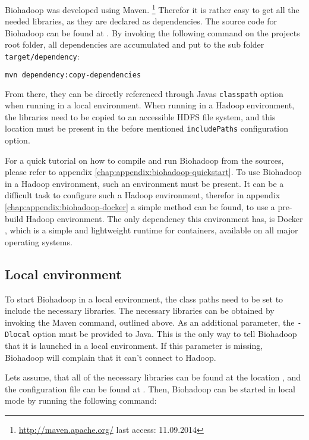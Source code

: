 Biohadoop was developed using Maven. \footnote{\url{http://maven.apache.org/} last access: 11.09.2014} Therefor it is rather easy to get all the needed libraries, as they are declared as dependencies. The source code for Biohadoop can be found at \cite{biohadoop}. By invoking the following command on the projects root folder, all dependencies are accumulated and put to the sub folder \texttt{target/dependency}:

\begin{lstlisting}[language=bash]
mvn dependency:copy-dependencies
\end{lstlisting}

From there, they can be directly referenced through Javas \texttt{classpath} option when running in a local environment. When running in a Hadoop environment, the libraries need to be copied to an accessible HDFS file system, and this location must be present in the before mentioned \texttt{includePaths} configuration option.

For a quick tutorial on how to compile and run Biohadoop from the sources, please refer to appendix \ref{chap:appendix:biohadoop-quickstart}. To use Biohadoop in a Hadoop environment, such an environment must be present. It can be a difficult task to configure such a Hadoop environment, therefor in appendix \ref{chap:appendix:biohadoop-docker} a simple method can be found, to use a pre-build Hadoop environment. The only dependency this environment has, is Docker \cite{docker}, which is a simple and lightweight runtime for containers, available on all major operating systems.

\subsection{Local environment}
\label{chap:usage:local}
To start Biohadoop in a local environment, the class paths need to be set to include the necessary libraries. The necessary libraries can be obtained by invoking the Maven command, outlined above. As an additional parameter, the \texttt{-Dlocal} option must be provided to Java. This is the only way to tell Biohadoop that it is launched in a local environment. If this parameter is missing, Biohadoop will complain that it can't connect to Hadoop.

Lets assume, that all of the necessary libraries can be found at the location , and the configuration file can be found at . Then, Biohadoop can be started in local mode by running the following command:

